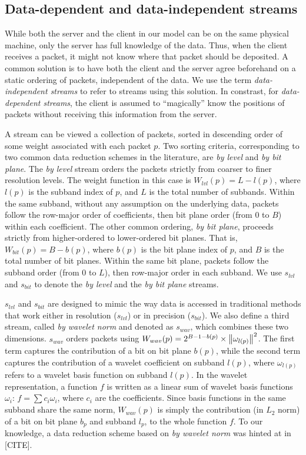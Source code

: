 \subsection{Data-dependent and data-independent streams}\label{sec:static-dynamic-streams}

While both the server and the client in our model can be on the same physical machine, only the
server has full knowledge of the data. Thus, when the client receives a packet, it might not know
where that packet should be deposited. A common solution is to have both the client and the server
agree beforehand on a static ordering of packets, independent of the data. We use the term
\emph{data-independent streams} to refer to streams using this solution. In constrast, for
\emph{data-dependent streams}, the client is assumed to ``magically'' know the positions of packets
without receiving this information from the server.

A stream can be viewed a collection of packets, sorted in descending order of some weight associated
with each packet $p$. Two sorting criteria, corresponding to two common data reduction schemes in
the literature, are \emph{by level} and \emph{by bit plane}. The \emph{by level} stream orders the
packets strictly from coarser to finer resolution levels. The weight function in this case is
$W_{lvl}(p)=L-l(p)$, where $l(p)$ is the subband index of $p$, and $L$ is the total number of
subbands. Within the same subband, without any assumption on the underlying data, packets follow the
row-major order of coefficients, then bit plane order (from 0 to $B$) within each coefficient. The
other common ordering, \emph{by bit plane}, proceeds strictly from higher-ordered to lower-ordered
bit planes. That is, $W_{bit}(p)=B-b(p)$, where $b(p)$ is the bit plane index of $p$, and $B$ is the
total number of bit planes. Within the same bit plane, packets follow the subband order (from 0 to
$L$), then row-major order in each subband. We use $s_{lvl}$ and $s_{bit}$ to denote the \emph{by
level} and the \emph{by bit plane} streams.

$s_{lvl}$ and $s_{bit}$ are designed to mimic the way data is accessed in traditional methods that
work either in resolution ($s_{lvl}$) or in precision ($s_{bit}$). We also define a third stream,
called \emph{by wavelet norm} and denoted as $s_{wav}$, which combines these two dimensions.
$s_{wav}$ orders packets using $W_{wav}(p)=2^{B-1-b(p)}\times \left\lVert\omega_{l(p)}\right\rVert^2$. The first
term captures the contribution of a bit on bit plane $b(p)$, while the second term captures the
contribution of a wavelet coefficient on subband $l(p)$, where $\omega_{l(p)}$ refers to a wavelet
basis function on subband $l(p)$. In the wavelet representation, a function $f$ is written as a
linear sum of wavelet basis functions $\omega_i$: $f=\sum{c_i\omega_i}$, where $c_i$ are the
coefficients. Since basis functions in the same subband share the same norm, $W_{wav}(p)$ is simply
the contribution (in $L_2$ norm) of a bit on bit plane $b_p$ and subband $l_p$, to the whole
function $f$. To our knowledge, a data reduction scheme based on \emph{by wavelet norm} was hinted
at in [CITE]. 

